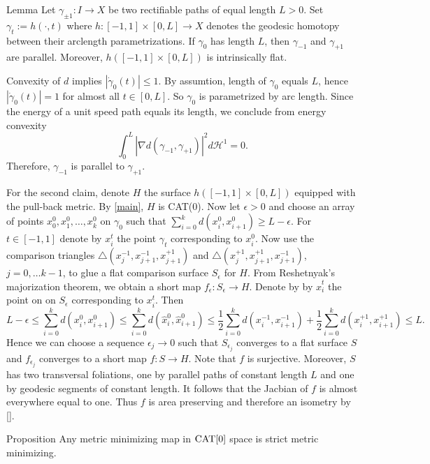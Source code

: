 \documentclass[a4paper,10pt]{amsart}
\begin{document}
\begin{thm}{Lemma}
Let $\gamma_{\pm 1}:I\to X$ be two rectifiable paths of equal length $L>0$. Set $\gamma_t:=h(\cdot,t)$ where $h:[-1,1]\times[0,L]\to X$ denotes the geodesic homotopy
between their arclength parametrizations. If $\gamma_0$ has length $L$, then $\gamma_{-1}$ and $\gamma_{+1}$ are parallel. Moreover, $h([-1,1]\times[0,L])$ is intrinsically 
flat.
\end{thm}
Convexity of $d$ implies $|\dot\gamma_0(t)|\leq 1$. By assumtion, length of $\gamma_0$ equals $L$, hence $|\dot\gamma_0(t)|=1$ for almost all $t\in[0,L]$. So $\gamma_0$
is parametrized by arc length. Since the energy of a unit speed path equals its length, we conclude from energy convexity 
$$
\int_0^L|\nabla d(\gamma_{-1},\gamma_{+1})|^2 d\mathcal{H}^1=0.
$$
Therefore, $\gamma_{-1}$ is parallel to $\gamma_{+1}$.

For the second claim, denote $H$ the surface $h([-1,1]\times[0,L])$ equipped with the pull-back metric. By \ref{main}, $H$
is CAT(0).
Now let $\epsilon>0$ and choose an array of points $x_0^{0},x_1^{0},\ldots,x_k^{0}$ on $\gamma_{0}$ 
such that $\sum_{i=0}^k d(x_i^{0},x_{i+1}^{0})\geq L-\epsilon$. For $t\in[-1,1]$ denote by $x_i^{t}$ the
point $\gamma_t$ corresponding to $x_i^{0}$. Now use the comparison triangles
$\triangle(x_{j}^{-1},x_{j+1}^{-1},x_{j+1}^{+1})$ and $\triangle(x_{j}^{+1},x_{j+1}^{+1},x_{j+1}^{-1})$, $j=0,\ldots k-1$,
to glue a flat comparison surface $S_\epsilon$ for $H$. From Reshetnyak's majorization theorem, we obtain a short map 
$f_\epsilon:S_\epsilon\to H$. Denote by by $\hat x_i^{t}$ the point on on $S_\epsilon$ corresponding to $x_i^{t}$. Then
$$
L-\epsilon\leq\sum_{i=0}^k d(x_i^{0},x_{i+1}^{0})\leq\sum_{i=0}^k d(\hat x_i^{0},\hat x_{i+1}^{0})\leq
\frac{1}{2}\sum_{i=0}^k d(x_i^{-1}, x_{i+1}^{-1})+\frac{1}{2}\sum_{i=0}^k d(x_i^{+1}, x_{i+1}^{+1})\leq L.
$$
Hence we can choose a sequence $\epsilon_j\to 0$ such that $S_{\epsilon_j}$ converges to a flat surface $S$ and $f_{\epsilon_j}$
converges to a short map $f:S\to H$. Note that $f$ is surjective. Moreover, $S$
has two transversal foliations, one by parallel paths of constant length $L$ and one by geodesic segments of constant length.
It follows that the Jacbian of $f$ is almost everywhere equal to one. Thus $f$ is area preserving and therefore an isometry by \ref{}.
\qeds


\begin{thm}{Proposition}\label{prop:strict-mm}
Any metric minimizing map in $\mathop{\rm CAT}\nolimits[0]$ space is strict metric minimizing.
\end{thm}
\end{document}
